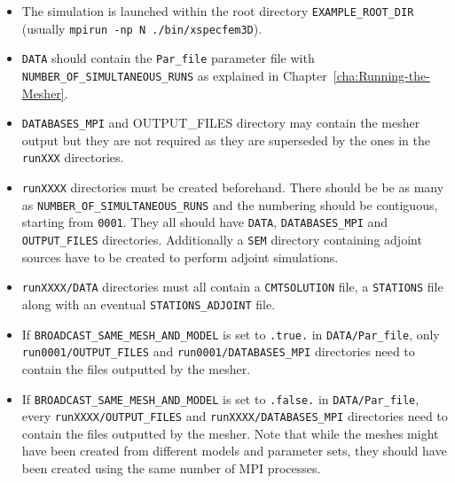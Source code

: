 \begin{itemize}
\item The simulation is launched within the root directory \texttt{EXAMPLE\_ROOT\_DIR}\newline
(usually \texttt{mpirun -np N ./bin/xspecfem3D}).
\item \texttt{DATA} should contain the \texttt{Par\_file} parameter file with
\texttt{NUMBER\_OF\_SIMULTANEOUS\_RUNS} as explained in Chapter~\ref{cha:Running-the-Mesher}.
\item \texttt{DATABASES\_MPI} and {OUTPUT\_FILES} directory may contain the mesher output but they
are not required as they are superseded by the ones in the \texttt{runXXX} directories.
\item \texttt{runXXXX} directories must be created beforehand. There should be be as many as
\texttt{NUMBER\_OF\_SIMULTANEOUS\_RUNS} and the numbering should be contiguous, starting from \texttt{0001}.
They all should have \texttt{DATA},
\texttt{DATABASES\_MPI} and \texttt{OUTPUT\_FILES} directories. Additionally a \texttt{SEM} directory
containing adjoint sources have to be created to perform adjoint simulations.
\item \texttt{runXXXX/DATA} directories must all contain a \texttt{CMTSOLUTION} file,
a \texttt{STATIONS} file along with an eventual \texttt{STATIONS\_ADJOINT} file.
\item If \texttt{BROADCAST\_SAME\_MESH\_AND\_MODEL} is set to \texttt{.true.} in \texttt{DATA/Par\_file},
only \texttt{run0001/OUTPUT\_FILES} and \texttt{run0001/DATABASES\_MPI} directories need to contain the files
outputted by the mesher.
\item If \texttt{BROADCAST\_SAME\_MESH\_AND\_MODEL} is set to \texttt{.false.} in \texttt{DATA/Par\_file},
every \texttt{runXXXX/OUTPUT\_FILES} and \texttt{runXXXX/DATABASES\_MPI} directories need to contain the files
outputted by the mesher. Note that while the meshes might have been created from different models and
parameter sets, they should have been created using the same number of MPI processes.
\end{itemize}



